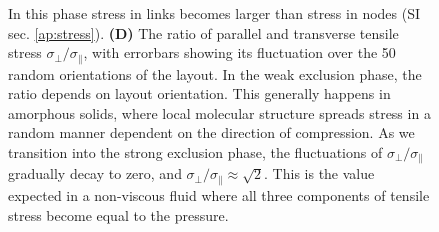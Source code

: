 \documentclass[nofootinbib,preprint,floatfix,titlepage,endfloats]{revtex4} %
\begin{document}
\begin{figure}
{    In this phase stress in links becomes larger than stress in nodes (SI sec. \ref{ap:stress}). 
    {\bf (D)} The ratio of parallel and transverse tensile stress $\sigma_\perp/\sigma_\parallel$, with errorbars showing its fluctuation over the 50 random orientations of the layout. 
    In the weak exclusion phase, the ratio depends on layout orientation. This generally happens in amorphous solids, where local molecular structure spreads stress in a random manner dependent on the direction of compression. 
    As we transition into the strong exclusion phase, the fluctuations of $\sigma_\perp/\sigma_\parallel$ gradually decay to zero, and $\sigma_\perp/\sigma_\parallel \approx \sqrt{2}$. 
    This is the value expected in a non-viscous fluid where all three components of tensile stress become equal to the pressure.}
    \label{fig:stress0}
\end{figure}
\end{document}
